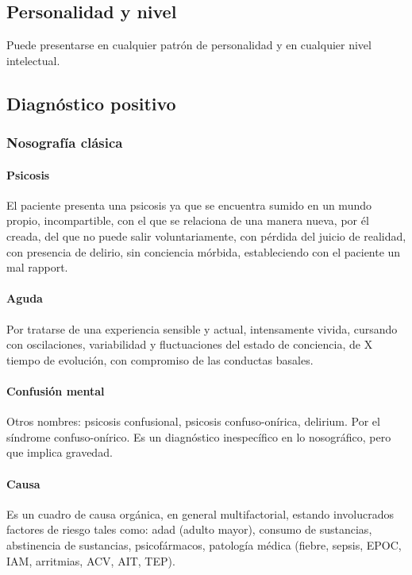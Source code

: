 \subsection*{Personalidad y nivel}
Puede presentarse en cualquier patrón de personalidad y en cualquier nivel intelectual.
\subsection*{Diagnóstico positivo}
\subsubsection*{Nosografía clásica}
\paragraph{Psicosis}
El paciente presenta una psicosis ya que se encuentra sumido en un mundo propio, incompartible, con el que se relaciona de una manera nueva, por él creada, del que no puede salir voluntariamente, con pérdida del juicio de realidad, con presencia de delirio, sin conciencia mórbida, estableciendo con el paciente un mal rapport.
\paragraph{Aguda}
Por tratarse de una experiencia sensible y actual, intensamente vivida, cursando con oscilaciones, variabilidad y fluctuaciones del estado de conciencia, de X tiempo de evolución, con compromiso de las conductas basales.
\paragraph{Confusión mental}
Otros nombres: psicosis confusional, psicosis confuso-onírica, delirium.
Por el síndrome confuso-onírico. Es un diagnóstico inespecífico en lo nosográfico, pero que implica gravedad.
\paragraph{Causa}
Es un cuadro de causa orgánica, en general multifactorial, estando involucrados factores de riesgo tales como: adad (adulto mayor), consumo de sustancias, abstinencia de sustancias, psicofármacos, patología médica (fiebre, sepsis, EPOC, IAM, arritmias, ACV, AIT, TEP).
